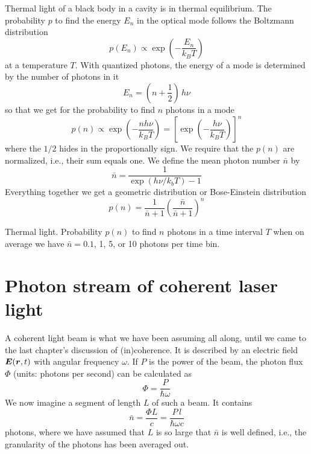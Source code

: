 Thermal light of a black body in a cavity is in thermal equilibrium. The probability $p$ to find the energy $E_n$ in the optical mode follows the Boltzmann distribution
\begin{equation}
    p(E_n) \propto \exp \left(  - \frac{E_n}{k_B T} \right)
\end{equation}
at a temperature $T$. With quantized photons, the energy of a mode is determined by the number of photons in it 
\begin{equation}
    E_n = \left( n + \frac{1}{2} \right) \, h \nu
\end{equation}
so that we get for the probability to find $n$ photons in a mode
\begin{equation}
    p(n) \propto  \exp \left(  - \frac{n h \nu}{k_B T} \right) = 
    \left[ \exp \left(  - \frac{h \nu}{k_B T} \right) \right]^n
\end{equation}
where the  $1/2$ hides in the proportionally sign.
We require that the $p(n)$ are normalized, i.e., their sum equals one. We define the mean photon number $\bar{n}$ by
\begin{equation}
    \bar{n} = \frac{1}{\exp( h \nu / k_b T) - 1}
\end{equation}
Everything together we get a geometric distribution or Bose-Einstein distribution 
\begin{equation}
    p(n) = \frac{1}{\bar{n} + 1} \left(\frac{\bar{n}}{\bar{n} + 1}  \right)^n
\end{equation}

\begin{marginfigure}
    \caption{Thermal light. Probability $p(n)$ to find $n$ photons in a time interval $T$ when on average we have $\bar{n} = 0.1$, 1, 5, or 10 photons per time bin.}
\end{marginfigure}

\section{Photon stream of coherent laser light}

A coherent light beam is what we have been assuming all along, until we came to the last chapter's discussion of (in)coherence. It is described by an electric field $\boldsymbol{E}(\boldsymbol{r}, t)$ with angular frequency $\omega$. If $P$ is the power of the beam, the photon flux $\Phi$ (units: photons per second) can be calculated as
\begin{equation}
    \Phi = \frac{P}{\hbar \omega}
\end{equation}
We now imagine a segment of length $L$ of such a beam. It contains
\begin{equation}
 \bar{n} = \frac{\Phi L}{c} = \frac{P \, l}{\hbar \omega c}
\end{equation}
photons, where we have assumed that $L$ is so large that $\bar{n}$ is well defined, i.e., the granularity of the photons has been averaged out. 

